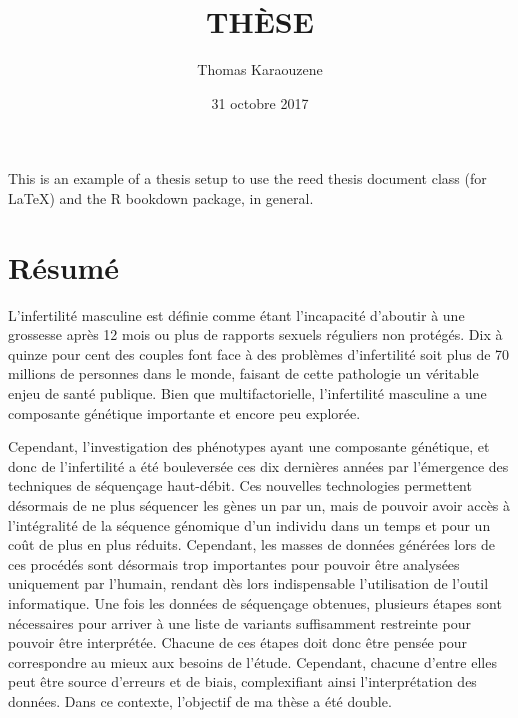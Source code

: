 \documentclass[12pt,twoside]{reedthesis}
\title{THÈSE}
\author{Thomas Karaouzene}
\date{31 octobre 2017}
\theoremstyle{definition}
\theoremstyle{definition}
\theoremstyle{remark}
\begin{document}
      \maketitle
  
  \frontmatter %
  \pagestyle{empty} %

  
      \begin{preface}
      This is an example of a thesis setup to use the reed thesis document
      class (for LaTeX) and the R bookdown package, in general.
    \end{preface}
  
      \hypersetup{linkcolor=black}
    \setcounter{tocdepth}{3}
    \tableofcontents
  
      \listoftables
  
      \listoffigures
  
  
  
  \mainmatter %
  \pagestyle{fancyplain} %

  \chapter*{Résumé}\label{resume}
  
  \newpage
  
  L'infertilité masculine est définie comme étant l'incapacité d'aboutir à
  une grossesse après 12 mois ou plus de rapports sexuels réguliers non
  protégés. Dix à quinze pour cent des couples font face à des problèmes
  d'infertilité soit plus de 70 millions de personnes dans le monde,
  faisant de cette pathologie un véritable enjeu de santé publique. Bien
  que multifactorielle, l'infertilité masculine a une composante génétique
  importante et encore peu explorée.
  
  Cependant, l'investigation des phénotypes ayant une composante
  génétique, et donc de l'infertilité a été bouleversée ces dix dernières
  années par l'émergence des techniques de séquençage haut-débit. Ces
  nouvelles technologies permettent désormais de ne plus séquencer les
  gènes un par un, mais de pouvoir avoir accès à l'intégralité de la
  séquence génomique d'un individu dans un temps et pour un coût de plus
  en plus réduits. Cependant, les masses de données générées lors de ces
  procédés sont désormais trop importantes pour pouvoir être analysées
  uniquement par l'humain, rendant dès lors indispensable l'utilisation de
  l'outil informatique. Une fois les données de séquençage obtenues,
  plusieurs étapes sont nécessaires pour arriver à une liste de variants
  suffisamment restreinte pour pouvoir être interprétée. Chacune de ces
  étapes doit donc être pensée pour correspondre au mieux aux besoins de
  l'étude. Cependant, chacune d'entre elles peut être source d'erreurs et
  de biais, complexifiant ainsi l'interprétation des données. Dans ce
  contexte, l'objectif de ma thèse a été double.
  
\end{document}
